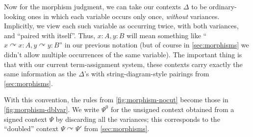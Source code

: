 \documentclass{amsart}
\newcommand{\unsigned}[1]{#1^0}
\newcommand{\strto}{\curvearrowright}
\theoremstyle{definition}
\begin{document}
Now for the morphism judgment, we can take our contexts $\Delta$ to be ordinary-looking ones in which each variable occurs only once, \emph{without} variances.
Implicitly, we view each such variable as occurring twice, with both variances, and ``paired with itself''.
Thus, $x:A,y:B$ will mean something like ``$x\strto x:A, y\strto y:B$'' in our previous notation (but of course in \cref{sec:morphisms} we didn't allow multiple occurrences of the same variable).
The important thing is that with our current term-assignment system, these contexts carry exactly the same information as the $\Delta$'s with string-diagram-style pairings from \cref{sec:morphisms}.

With this convention, the rules from \cref{fig:morphism-nocut} become those in \cref{fig:morphism-dblvar}.
We write $\unsigned{\Psi}$ for the unsigned context obtained from a signed context $\Psi$ by discarding all the variances; this corresponds to the ``doubled'' context $\Psi\strto\Psi'$ from \cref{sec:morphisms}.
\end{document}
